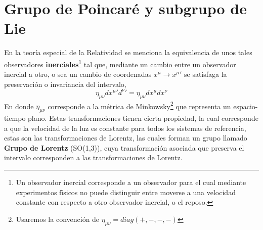 \documentclass[12pt,letterpaper]{article}
\begin{document}
\section{Grupo de Poincaré y subgrupo de Lie }
En la teoría especial de la Relatividad \cite{r-especial} se menciona la equivalencia de unos tales observadores \textbf{inerciales}\footnote{Un observador inercial corresponde a un observador para el cual mediante experimentos físicos no puede distinguir entre moverse a una velocidad constante con respecto a otro observador inercial, o el reposo.} tal que, mediante un cambio entre un observador inercial a otro, o sea un cambio de coordenadas $x^\mu \to x^\mu '$ se satisfaga la preservación o invariancia del intervalo,
\begin{equation}
  \eta_{\mu \nu}dx^\mu'd^\nu' = \eta_{\mu \nu}dx^\mu dx^\nu
\end{equation}
En donde $\eta_{\mu\nu}$ corresponde a la métrica de Minkowsky\footnote{Usaremos la convención de $\eta_{\mu \nu}=diag(+,-,-,-)$} que representa un espacio-tiempo plano. Estas transformaciones tienen cierta propiedad, la cual corresponde a que la velocidad de la luz es constante para todos los sistemas de referencia, estas son las transformaciones de Lorentz, las cuales forman un grupo llamado \textbf{Grupo de Lorentz} (SO(1,3)), cuya transformación asociada que preserva el intervalo corresponden a las transformaciones de Lorentz.
\end{document}
